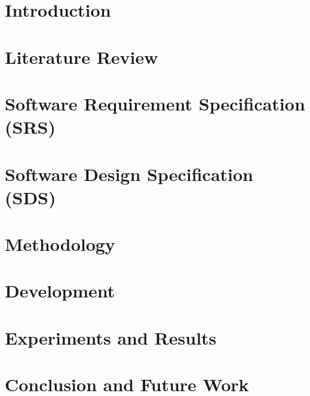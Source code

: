 \documentclass[12pt,twosided]{report}
\begin{document}
\tableofcontents
\listoffigures
\listoftables

\chapter{Introduction}
\label{chap:intro}


\chapter{Literature Review}
\label{chap:lit}


\chapter{Software Requirement Specification (SRS)}
\label{chap:srs}


\chapter{Software Design Specification (SDS)}
\label{chap:sds}


\chapter{Methodology}
\label{chap:method}


\chapter{Development}
\label{chap:dev}


\chapter{Experiments and Results}
\label{chap:results}



\chapter{Conclusion and Future Work}
\label{chap:outro}

\end{document}
